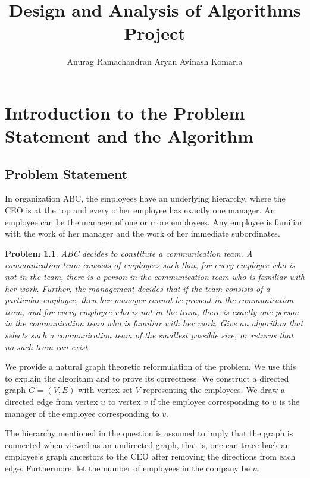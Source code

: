 \documentclass[ a4paper, 11pt]{report}
\title{\textbf{\textcolor{JungleGreen}{Design and Analysis of Algorithms Project}}}
\author{Anurag Ramachandran\affiliation{Roll Number: bmat2310} \quad \quad Aryan Avinash Komarla\affiliation{Roll Number: bmat2411}}
\date{}
\theoremstyle{plain}
\newtheorem{problem}[theorem]{Problem}
\theoremstyle{definition}
\begin{document}
\maketitle
\tableofcontents
\newpage 

\chapter{Introduction to the Problem Statement and the Algorithm}
\section{Problem Statement}

In organization ABC, the employees have an underlying hierarchy, where the CEO is at the top and every other employee has exactly one manager. An employee can be the manager of one or more employees. Any employee is familiar with the work of her manager and the work of her immediate subordinates.

\begin{problem}
ABC decides to constitute a communication team. A communication team consists of employees such that, for every employee who is not in the team, there is a person in the communication team who is familiar with her work. Further, the management decides that if the team consists of a particular employee, then her manager cannot be present in the communication team, and for every employee who is not in the team, there is exactly one person in the communication team who is familiar with her work. Give an algorithm that selects such a communication team of the smallest possible size, or returns that no such team can exist.
\end{problem}

We provide a natural graph theoretic reformulation of the problem. We use this to explain the algorithm and to prove its correctness. We construct a directed graph $G=(V,E)$ with vertex set $V$ representing the employees. We draw a directed edge from vertex $u$ to vertex $v$ if the employee corresponding to $u$ is the manager of the employee corresponding to $v$.
\newline

The hierarchy mentioned in the question is assumed to imply that the graph is connected when viewed as an undirected graph, that is, one can trace back an employee's graph ancestors to the CEO after removing the directions from each edge. Furthermore, let the number of employees in the company be $n$.
\newline
\end{document}
